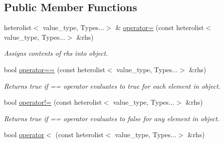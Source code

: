 \subsection*{Public Member Functions}
\begin{DoxyCompactItemize}
\item 
\hypertarget{classheterogeneous_1_1heterolist_3_01_t_00_01_types_8_8_8_4_a10966630bbe098ce24932800c79a2feb}{}heterolist$<$ value\+\_\+type, Types...$>$ \& \hyperlink{classheterogeneous_1_1heterolist_3_01_t_00_01_types_8_8_8_4_a10966630bbe098ce24932800c79a2feb}{operator=} (const heterolist$<$ value\+\_\+type, Types...$>$ \&rhs)\label{classheterogeneous_1_1heterolist_3_01_t_00_01_types_8_8_8_4_a10966630bbe098ce24932800c79a2feb}

\begin{DoxyCompactList}\small\item\em Assigns contents of rhs into object. \end{DoxyCompactList}\item 
\hypertarget{classheterogeneous_1_1heterolist_3_01_t_00_01_types_8_8_8_4_aecc181d94c6efcc558165a28f78e80ed}{}bool \hyperlink{classheterogeneous_1_1heterolist_3_01_t_00_01_types_8_8_8_4_aecc181d94c6efcc558165a28f78e80ed}{operator==} (const heterolist$<$ value\+\_\+type, Types...$>$ \&rhs)\label{classheterogeneous_1_1heterolist_3_01_t_00_01_types_8_8_8_4_aecc181d94c6efcc558165a28f78e80ed}

\begin{DoxyCompactList}\small\item\em Returns true if == operator evaluates to true for each element in object. \end{DoxyCompactList}\item 
\hypertarget{classheterogeneous_1_1heterolist_3_01_t_00_01_types_8_8_8_4_a53e1bd0be0ab821b51bd3b41dcd9a946}{}bool \hyperlink{classheterogeneous_1_1heterolist_3_01_t_00_01_types_8_8_8_4_a53e1bd0be0ab821b51bd3b41dcd9a946}{operator!=} (const heterolist$<$ value\+\_\+type, Types...$>$ \&rhs)\label{classheterogeneous_1_1heterolist_3_01_t_00_01_types_8_8_8_4_a53e1bd0be0ab821b51bd3b41dcd9a946}

\begin{DoxyCompactList}\small\item\em Returns true if == operator evaluates to false for any element in object. \end{DoxyCompactList}\item 
\hypertarget{classheterogeneous_1_1heterolist_3_01_t_00_01_types_8_8_8_4_a87a20755f4a377b08b1221e371a65042}{}bool \hyperlink{classheterogeneous_1_1heterolist_3_01_t_00_01_types_8_8_8_4_a87a20755f4a377b08b1221e371a65042}{operator$<$} (const heterolist$<$ value\+\_\+type, Types...$>$ \&rhs)\label{classheterogeneous_1_1heterolist_3_01_t_00_01_types_8_8_8_4_a87a20755f4a377b08b1221e371a65042}


\end{DoxyCompactItemize}
